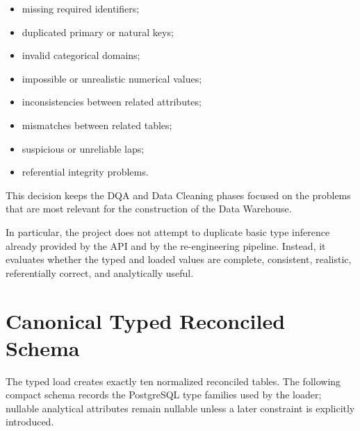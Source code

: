 \documentclass[a4paper,11pt]{article}
\begin{document}
	\begin{itemize}
		\item missing required identifiers;
		\item duplicated primary or natural keys;
		\item invalid categorical domains;
		\item impossible or unrealistic numerical values;
		\item inconsistencies between related attributes;
		\item mismatches between related tables;
		\item suspicious or unreliable laps;
		\item referential integrity problems.
	\end{itemize}
	
	This decision keeps the DQA and Data Cleaning phases focused on the problems that are most relevant for the construction of the Data Warehouse.
	
	In particular, the project does not attempt to duplicate basic type inference already provided by the API and by the re-engineering pipeline.
	Instead, it evaluates whether the typed and loaded values are complete, consistent, realistic, referentially correct, and analytically useful.

	\section{Canonical Typed Reconciled Schema}

	The typed load creates exactly ten normalized reconciled tables. The following compact
	schema records the PostgreSQL type families used by the loader; nullable analytical
	attributes remain nullable unless a later constraint is explicitly introduced.
\end{document}
